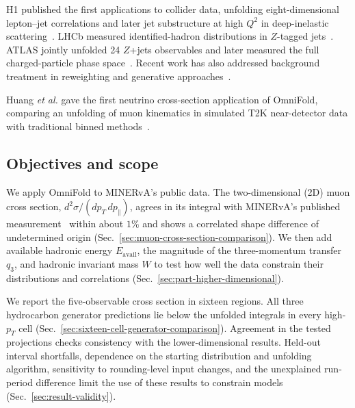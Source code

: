 H1 published the first applications to collider data, unfolding eight-dimensional lepton--jet correlations and later jet substructure at high $Q^2$ in deep-inelastic scattering~\cite{H1:2021wkz,H1:2023fzk}. LHCb measured identified-hadron distributions in $Z$-tagged jets~\cite{LHCb:2022rky}. ATLAS jointly unfolded 24 $Z$+jets observables and later measured the full charged-particle phase space~\cite{ATLAS:2024jets,ATLAS:2026fullps}. Recent work has also addressed background treatment in reweighting and generative approaches~\cite{Falcao:2025backgrounds,Butter:2025genfold}.

Huang \emph{et al.} gave the first neutrino cross-section application of OmniFold, comparing an unfolding of muon kinematics in simulated T2K near-detector data with traditional binned methods~\cite{Huang:2025omnifold}.

\subsection{Objectives and scope}

We apply OmniFold to MINERvA's public data. The two-dimensional (2D) muon cross section, $d^2\sigma/(dp_T\,dp_\parallel)$, agrees in its integral with MINERvA's published measurement~\cite{MINERvA:2021owq} within about $1\%$ and shows a correlated shape difference of undetermined origin (Sec.~\ref{sec:muon-cross-section-comparison}). We then add available hadronic energy $E_{\mathrm{avail}}$, the magnitude of the three-momentum transfer $q_3$, and hadronic invariant mass $W$ to test how well the data constrain their distributions and correlations (Sec.~\ref{sec:part-higher-dimensional}).

We report the five-observable cross section in sixteen regions. All three hydrocarbon generator predictions lie below the unfolded integrals in every high-$p_T$ cell (Sec.~\ref{sec:sixteen-cell-generator-comparison}). Agreement in the tested projections checks consistency with the lower-dimensional results. Held-out interval shortfalls, dependence on the starting distribution and unfolding algorithm, sensitivity to rounding-level input changes, and the unexplained run-period difference limit the use of these results to constrain models (Sec.~\ref{sec:result-validity}).

